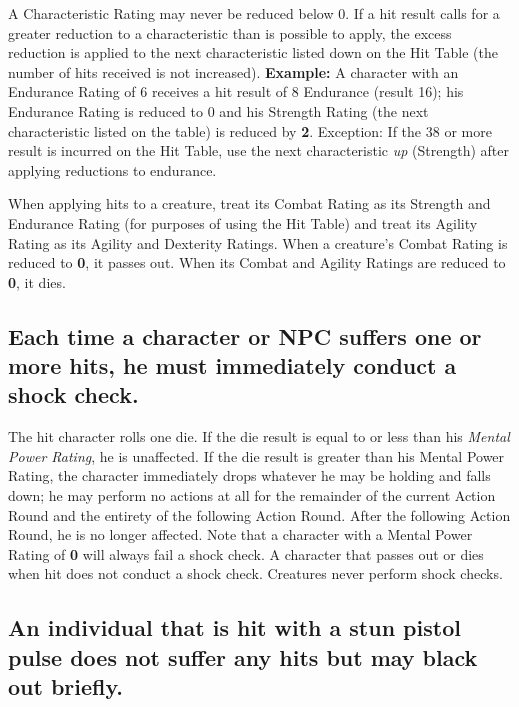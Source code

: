 A Characteristic Rating may never be reduced below 0. If a hit result
calls for a greater reduction to a characteristic than is possible to
apply, the excess reduction is applied to the next characteristic
listed down on the Hit Table (the number of hits received is not
increased). \textbf{Example:} A character with an Endurance Rating of
6 receives a hit result of 8 Endurance (result 16); his Endurance
Rating is reduced to 0 and his Strength Rating (the next
characteristic listed on the table) is reduced by \textbf{2}.
Exception: If the 38 or more result is incurred on the Hit Table, use
the next characteristic \emph{up} (Strength) after applying reductions
to endurance.

When applying hits to a creature, treat its Combat Rating as its
Strength and Endurance Rating (for purposes of using the Hit Table)
and treat its Agility Rating as its Agility and Dexterity Ratings.
When a creature's Combat Rating is reduced to \textbf{0}, it passes
out. When its Combat and Agility Ratings are reduced to \textbf{0}, it
dies.


\subsection[Shock Check]{Each time a character or NPC suffers one or
  more hits, he 
  must immediately conduct a shock check.}
\label{sec:shock-check}

The hit character rolls one die. If the die result is equal to or less
than his \emph{Mental Power Rating}, he is unaffected. If the die
result is greater than his Mental Power Rating, the character
immediately drops whatever he may be holding and falls down; he may
perform no actions at all for the remainder of the current Action
Round and the entirety of the following Action Round. After the
following Action Round, he is no longer affected. Note that a
character with a Mental Power Rating of \textbf{0} will always fail a
shock check. A character that passes out or dies when hit does not
conduct a shock check. Creatures never perform shock checks.

\subsection[Stun Pistols]{An individual that is hit with a stun pistol
  pulse does not suffer any hits but may black out briefly.} 
\label{sec:stun-pistol}

